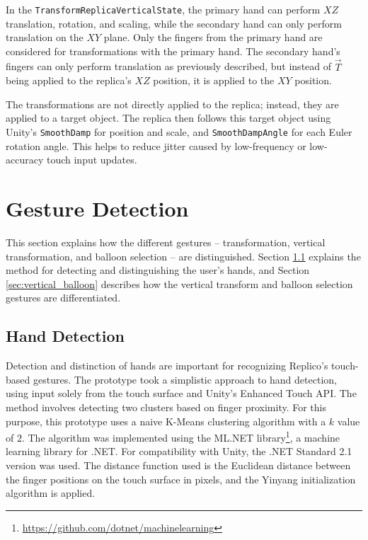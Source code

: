     In the \lstinline{TransformReplicaVerticalState}, the primary hand can perform $XZ$ translation, rotation, and scaling, while the secondary hand can only perform translation on the $XY$ plane. Only the fingers from the primary hand are considered for transformations with the primary hand. The secondary hand's fingers can only perform translation as previously described, but instead of \(\vec{T}\) being applied to the replica's $XZ$ position, it is applied to the $XY$ position.
    
    The transformations are not directly applied to the replica; instead, they are applied to a target object. The replica then follows this target object using Unity's \lstinline{SmoothDamp} for position and scale, and \lstinline{SmoothDampAngle} for each Euler rotation angle. This helps to reduce jitter caused by low-frequency or low-accuracy touch input updates.

\section{Gesture Detection}

    This section explains how the different gestures -- transformation, vertical transformation, and balloon selection -- are distinguished. Section \ref{sec:hand} explains the method for detecting and distinguishing the user's hands, and Section \ref{sec:vertical_balloon} describes how the vertical transform and balloon selection gestures are differentiated.

    \subsection{Hand Detection} \label{sec:hand}

        Detection and distinction of hands are important for recognizing Replico's touch-based gestures. The prototype took a simplistic approach to hand detection, using input solely from the touch surface and Unity's Enhanced Touch API. The method involves detecting two clusters based on finger proximity. For this purpose, this prototype uses a naive K-Means clustering algorithm \cite{zbMATH03340881, lloydLeastSquaresQuantization1982, 1571980074621944832} with a $k$ value of $2$. The algorithm was implemented using the ML.NET library\footnote{\url{https://github.com/dotnet/machinelearning}}, a machine learning library for .NET. For compatibility with Unity, the .NET Standard 2.1 version was used. The distance function used is the Euclidean distance between the finger positions on the touch surface in pixels, 
        and the Yinyang initialization algorithm \cite{pmlr-v37-ding15} is applied.
    
